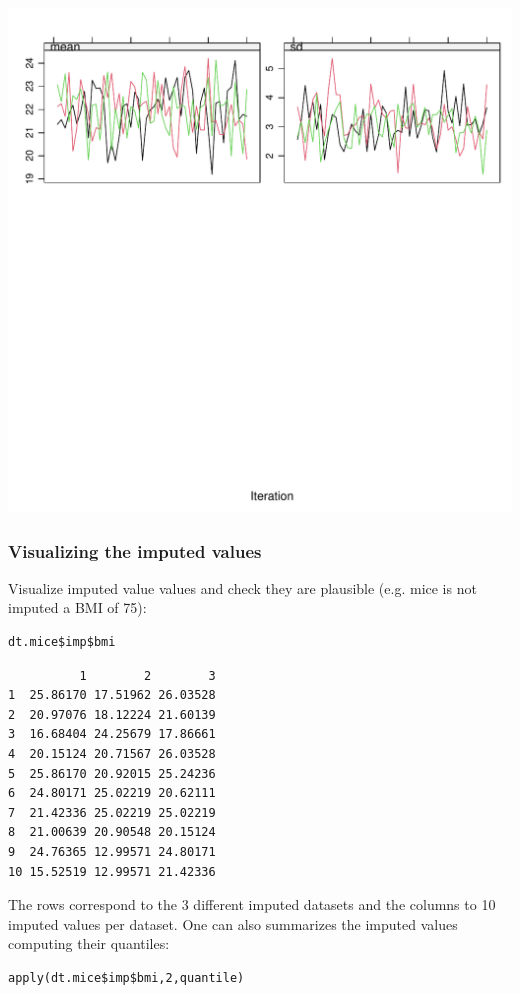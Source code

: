 \documentclass[12pt]{article}
\begin{document}
\begin{center}
\includegraphics[width=.9\linewidth]{./traceCVimputed.pdf}
\end{center}


\subsubsection{Visualizing the imputed values}
\label{sec:orgd7efc99}
Visualize imputed value values and check they are plausible (e.g. mice
is not imputed a BMI of 75):
\lstset{language=r,label= ,caption= ,captionpos=b,numbers=none}
\begin{lstlisting}
dt.mice$imp$bmi
\end{lstlisting}

\begin{verbatim}
          1        2        3
1  25.86170 17.51962 26.03528
2  20.97076 18.12224 21.60139
3  16.68404 24.25679 17.86661
4  20.15124 20.71567 26.03528
5  25.86170 20.92015 25.24236
6  24.80171 25.02219 20.62111
7  21.42336 25.02219 25.02219
8  21.00639 20.90548 20.15124
9  24.76365 12.99571 24.80171
10 15.52519 12.99571 21.42336
\end{verbatim}

The rows correspond to the 3 different imputed datasets and the
columns to 10 imputed values per dataset. One can also summarizes the
imputed values computing their quantiles:

\lstset{language=r,label= ,caption= ,captionpos=b,numbers=none}
\begin{lstlisting}
apply(dt.mice$imp$bmi,2,quantile)
\end{lstlisting}
\end{document}
